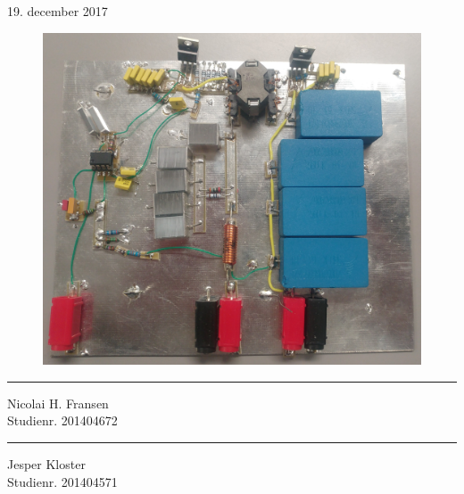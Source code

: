 \documentclass[11pt, a4paper, twoside, openany]{memoir}
\begin{document}
\begin{titlingpage}
\begin{center}
				19. december 2017
				\vspace{10pt}
				\begin{figure}[H]
					\centering
					\includegraphics[max width=0.9\linewidth]{converter.jpg}
				\end{figure}
				\vspace{50pt}
				\begin{minipage}{0.25\linewidth}
					\centering
					\hrule
					\vspace{12pt}
					Nicolai H. Fransen\\
					Studienr. 201404672
				\end{minipage}
				\hspace{10pt}
				\begin{minipage}{0.25\linewidth}
					\centering
					\hrule
					\vspace{12pt}
					Jesper Kloster\\
					Studienr. 201404571
				\end{minipage}
				\hspace{10pt}


		\end{center}

\end{titlingpage}
		
\end{document}
